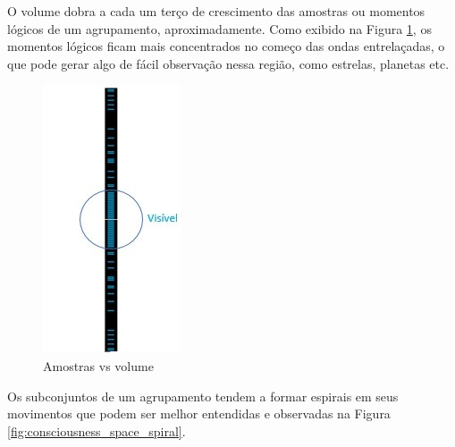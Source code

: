 O volume dobra a cada um terço de crescimento das amostras ou momentos lógicos de um agrupamento, aproximadamente. Como exibido na Figura \ref{fig:consciousness_space_volume}, os momentos lógicos ficam mais concentrados no começo das ondas entrelaçadas, o que pode gerar algo de fácil observação nessa região, como estrelas, planetas etc. 
\begin{figure}[H]
	\caption{Amostras vs volume}
	\label{fig:consciousness_space_volume}
	\centering
	\includegraphics[scale=.8]{sections/images/consciousness_dark_matter_dark_energy_wave.jpg}
	\end{figure}

Os subconjuntos de um agrupamento tendem a formar espirais em seus movimentos que podem ser melhor entendidas e observadas na Figura \ref{fig:consciousness_space_spiral}.

